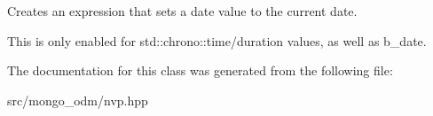 Creates an expression that sets a date value to the current date. 

This is only enabled for std\+::chrono\+::time/duration values, as well as b\+\_\+date. 

The documentation for this class was generated from the following file\+:\begin{DoxyCompactItemize}
\item 
src/mongo\+\_\+odm/nvp.\+hpp\end{DoxyCompactItemize}
